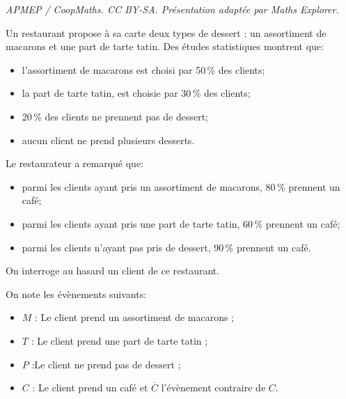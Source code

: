 \documentclass[10pt]{article}
\begin{document}
\noindent\textit{APMEP / CoopMaths. CC BY-SA. Présentation adaptée par Maths Explorer.}\par\medskip
\medskip

Un restaurant propose à sa carte deux types de dessert : un assortiment de macarons et une part de tarte tatin. Des études statistiques montrent que:

\setlength\parindent{1cm}
\begin{itemize}
\item l'assortiment de macarons est choisi par 50\,\% des clients;
\item la part de tarte tatin, est choisie par 30\,\% des clients;
\item 20\,\% des clients ne prennent pas de dessert;
\item aucun client ne prend plusieurs desserts.
\end{itemize}
\setlength\parindent{0cm}

Le restaurateur a remarqué que:

\setlength\parindent{1cm}
\begin{itemize}
\item parmi les clients ayant pris un assortiment de macarons, 80\,\% prennent un café;
\item parmi les clients ayant pris une part de tarte tatin, 60\,\% prennent un café;
\item parmi les clients n'ayant pas pris de dessert, 90\,\% prennent un café.
\end{itemize}
\setlength\parindent{0cm}

On interroge au hasard un client de ce restaurant. 

On note les évènements suivants:

\setlength\parindent{1cm}
\begin{itemize}
\item $M$ : \og Le client prend un assortiment de macarons \fg{};
\item $T$ : \og Le client prend une part de tarte tatin \fg{} ;
\item $P$ :\og Le client ne prend pas de dessert\fg{} ;
\item $C$ : \og Le client prend un café\fg{} et $\overline{C}$ l'évènement contraire de $C$.
\end{itemize}
\setlength\parindent{0cm}

\medskip
\end{document}
